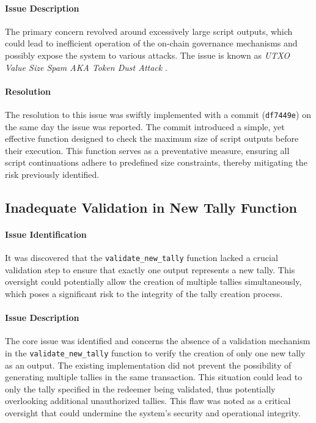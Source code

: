 \documentclass[11pt]{article}
\begin{document}
\paragraph{Issue Description}
The primary concern revolved around excessively large script outputs, which could lead to inefficient operation of the on-chain governance mechanisms and possibly expose the system to various attacks. The issue is known as \textit{UTXO Value Size Spam AKA Token Dust Attack} \cite{CommonVuls}.

\paragraph{Resolution}
The resolution to this issue was swiftly implemented with a commit (\texttt{df7449e}) on the same day the issue was reported. The commit introduced a simple, yet effective function designed to check the maximum size of script outputs before their execution. This function serves as a preventative measure, ensuring all script continuations adhere to predefined size constraints, thereby mitigating the risk previously identified.


\subsection{Inadequate Validation in New Tally Function}

\paragraph{Issue Identification}
It was discovered that the \texttt{validate\_new\_tally} function lacked a crucial validation step to ensure that exactly one output represents a new tally.
This oversight could potentially allow the creation of multiple tallies simultaneously, which poses a significant risk to the integrity of the tally creation process.

\paragraph{Issue Description}
The core issue was identified and concerns the absence of a validation mechanism in the \texttt{validate\_new\_tally} function to verify the creation of only one new tally as an output.
The existing implementation did not prevent the possibility of generating multiple tallies in the same transaction.
This situation could lead to only the tally specified in the redeemer being validated, thus potentially overlooking additional unauthorized tallies.
This flaw was noted as a critical oversight that could undermine the system's security and operational integrity.
\end{document}
